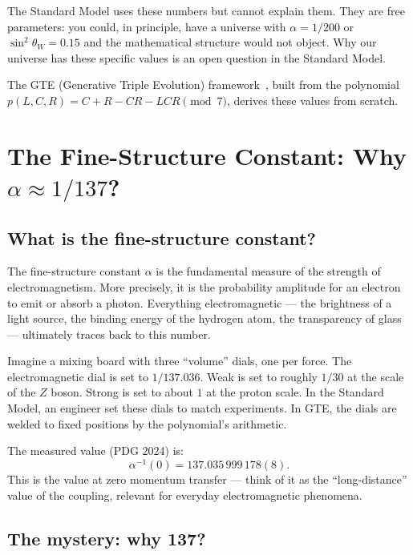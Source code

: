 \documentclass[11pt,a4paper]{article}
\newcommand{\sinwsq}{\sin^2\!\theta_W}
\begin{document}
\noindent
The Standard Model uses these numbers but cannot explain them.  They are
free parameters: you could, in principle, have a universe with $\alpha = 1/200$
or $\sinwsq = 0.15$ and the mathematical structure would not object.  Why
our universe has these specific values is an open question in the Standard Model.

The GTE (Generative Triple Evolution) framework~\cite{SpivackGTECompleteFramework}, built from the polynomial
$p(L,C,R) = C + R - CR - LCR \pmod 7$, derives these values from scratch.

\section{The Fine-Structure Constant: Why $\alpha \approx 1/137$?}

\subsection{What is the fine-structure constant?}

The fine-structure constant $\alpha$ is the fundamental measure of the
strength of electromagnetism.  More precisely, it is the probability
amplitude for an electron to emit or absorb a photon.  Everything
electromagnetic — the brightness of a light source, the binding energy
of the hydrogen atom, the transparency of glass — ultimately traces
back to this number.

\begin{tcolorbox}[colback=boxorange,colframe=orange!60!black,title=An analogy: volume on a mixer]
Imagine a mixing board with three ``volume'' dials, one per force.  The
electromagnetic dial is set to $1/137.036$.  Weak is set to roughly
$1/30$ at the scale of the $Z$ boson.  Strong is set to about $1$ at
the proton scale.  In the Standard Model, an engineer set these dials to
match experiments.  In GTE, the dials are welded to fixed positions by
the polynomial's arithmetic.
\end{tcolorbox}

The measured value (PDG 2024) is:
\[
  \alpha^{-1}(0) = 137.035\,999\,178(8).
\]
This is the value at zero momentum transfer — think of it as
the ``long-distance'' value of the coupling, relevant for everyday
electromagnetic phenomena.

\subsection{The mystery: why 137?}
\end{document}
